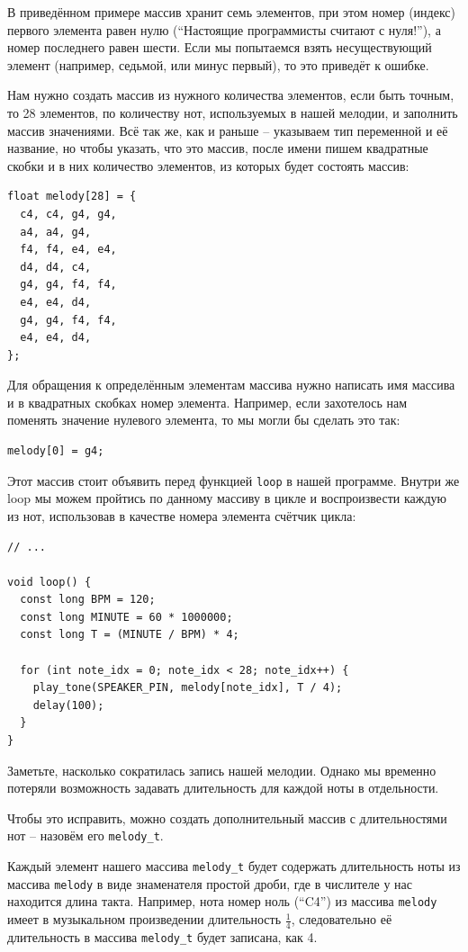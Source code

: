\documentclass[a4paper,twoside]{book}
\begin{document}
В приведённом примере массив хранит семь элементов, при этом номер (индекс)
первого элемента равен нулю (``Настоящие программисты считают с нуля!''), а
номер последнего равен шести. Если мы попытаемся взять несуществующий элемент
(например, седьмой, или минус первый), то это приведёт к ошибке.

Нам нужно создать массив из нужного количества элементов, если быть точным, то
28 элементов, по количеству нот, используемых в нашей мелодии, и заполнить
массив значениями. Всё так же, как и раньше -- указываем тип переменной и её
название, но чтобы указать, что это массив, после имени пишем квадратные скобки
и в них количество элементов, из которых будет состоять массив:

\begin{verbatim}
float melody[28] = {
  c4, c4, g4, g4,
  a4, a4, g4,
  f4, f4, e4, e4,
  d4, d4, c4,
  g4, g4, f4, f4,
  e4, e4, d4,
  g4, g4, f4, f4,
  e4, e4, d4,
};
\end{verbatim}

Для обращения к определённым элементам массива нужно написать имя массива и в
квадратных скобках номер элемента. Например, если захотелось нам поменять
значение нулевого элемента, то мы могли бы сделать это так:

\begin{verbatim}
melody[0] = g4;
\end{verbatim}

Этот массив стоит объявить перед функцией \texttt{loop} в нашей программе.
Внутри же loop мы можем пройтись по данному массиву в цикле и воспроизвести
каждую из нот, использовав в качестве номера элемента счётчик цикла:

\begin{verbatim}
// ...

void loop() {
  const long BPM = 120;
  const long MINUTE = 60 * 1000000;
  const long T = (MINUTE / BPM) * 4;

  for (int note_idx = 0; note_idx < 28; note_idx++) {
    play_tone(SPEAKER_PIN, melody[note_idx], T / 4);
    delay(100);
  }
}
\end{verbatim}

Заметьте, насколько сократилась запись нашей мелодии. Однако мы временно
потеряли возможность задавать длительность для каждой ноты в отдельности.

Чтобы это исправить, можно создать дополнительный массив с длительностями нот --
назовём его \texttt{melody\_t}.

Каждый элемент нашего массива \texttt{melody\_t} будет содержать длительность
ноты из массива \texttt{melody} в виде знаменателя простой дроби, где в
числителе у нас находится длина такта. Например, нота номер ноль (``C4'') из
массива \texttt{melody} имеет в музыкальном произведении длительность
$\frac{1}{4}$, следовательно её длительность в массива \texttt{melody\_t} будет
записана, как 4.
\end{document}
